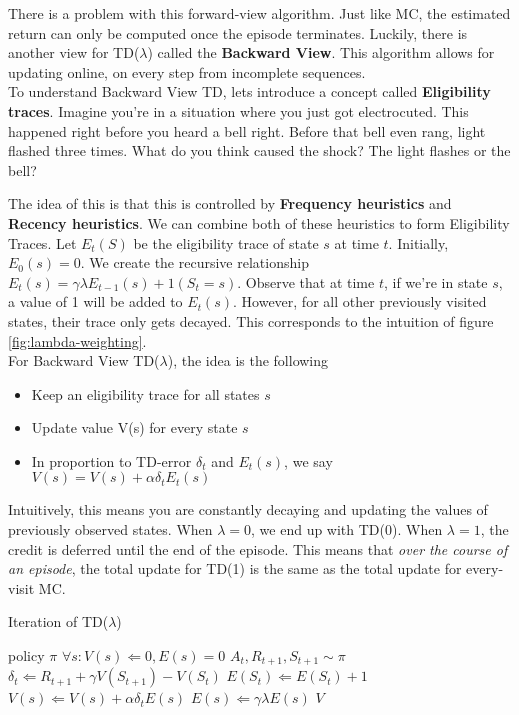 There is a problem with this forward-view algorithm. Just like MC, the estimated return can only be computed once the episode terminates. Luckily, there is another view for TD($\lambda$) called the \textbf{Backward View}. This algorithm allows for updating online, on every step from incomplete sequences. \\

To understand Backward View TD, lets introduce a concept called \textbf{Eligibility traces}. Imagine you're in a situation where you just got electrocuted. This happened right before you heard a bell right. Before that bell even rang, light flashed three times. What do you think caused the shock? The light flashes or the bell? 

The idea of this is that this is controlled by \textbf{Frequency heuristics} and \textbf{Recency heuristics}. We can combine both of these heuristics to form Eligibility Traces. Let $E_t(S)$ be the eligibility trace of state $s$ at time $t$. Initially, $E_0(s) = 0$. We create the recursive relationship $E_t(s) = \gamma \lambda E_{t-1}(s) + 1(S_t = s)$. Observe that at time $t$, if we're in state $s$, a value of 1 will be added to $E_t(s)$. However, for all other previously visited states, their trace only gets decayed. This corresponds to the intuition of figure \ref{fig:lambda-weighting}.\\

For Backward View TD($\lambda$), the idea is the following
\begin{itemize}
	\item Keep an eligibility trace for all states $s$
	\item Update value V(s) for every state $s$
	\item In proportion to TD-error $\delta_t$ and $E_t(s)$, we say $V(s) = V(s) + \alpha \delta_t E_t(s)$
\end{itemize}

Intuitively, this means you are constantly decaying and updating the values of previously observed states. When $\lambda = 0$, we end up with TD(0). When $\lambda = 1$, the credit is deferred until the end of the episode. This means that \textit{over the course of an episode}, the total update for TD(1) is the same as the total update for every-visit MC.

\begin{algorithm}[H]
	\caption{Iteration of TD($\lambda$)}
	\label{alg:MC-eval}
	\begin{algorithmic}
		\REQUIRE policy $\pi$
		\STATE $\forall s: V(s) \Leftarrow 0, E(s) = 0$
		\STATE $A_t, R_{t+1}, S_{t+1} \sim \pi$
		\STATE $\delta_t \Leftarrow R_{t+1} + \gamma V(S_{t+1}) - V(S_t)$
		\STATE $E(S_t) \Leftarrow E(S_t) + 1$
				\STATE $V(s) \Leftarrow V(s) + \alpha \delta_t E(s)$
				\STATE $E(s) \Leftarrow \gamma \lambda E(s)$
			\ENDFOR
		\ENDFOR
		\RETURN $V$
	\end{algorithmic}
\end{algorithm}
 